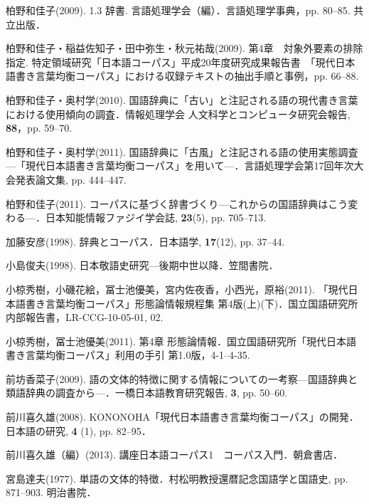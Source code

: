 \documentclass[japanese]{jnlp_1.4}
\begin{document}
\begin{thebibliography}{}
\item
柏野和佳子(2009). 1.3 辞書. 言語処理学会（編）．言語処理学事典，pp. 80--85. 共立出版．

\item
柏野和佳子・稲益佐知子・田中弥生・秋元祐哉(2009). 第4章　対象外要素の排除指定. 
特定領域研究「日本語コーパス」平成20年度研究成果報告書　「現代日本語書き言葉均衡コーパス」における収録テキストの抽出手順と事例，pp. 66--88.

\item
柏野和佳子・奥村学(2010). 
国語辞典に「古い」と注記される語の現代書き言葉における使用傾向の調査．情報処理学会 
人文科学とコンピュータ研究会報告, \textbf{88}，pp. 59--70.

\item
柏野和佳子・奥村学(2011). 
国語辞典に「古風」と注記される語の使用実態調査—「現代日本語書き言葉均衡コーパス」を用いて—．言語処理学会第17回年次大会発表論文集, 
pp. 444--447.

\item
柏野和佳子(2011). 
コーパスに基づく辞書づくり—これからの国語辞典はこう変わる—．日本知能情報ファジイ学会誌, 
\textbf{23}(5), pp. 705--713.

\item
加藤安彦(1998). 辞典とコーパス．日本語学, \textbf{17}(12), pp. 37--44.

\item
小島俊夫(1998). 日本敬語史研究—後期中世以降．笠間書院．

\item
小椋秀樹，小磯花絵，冨士池優美，宮内佐夜香，小西光，原裕(2011). 
「現代日本語書き言葉均衡コーパス」形態論情報規程集 
第4版(上)(下)．国立国語研究所内部報告書，LR-CCG-10-05-01, 02.

\item
小椋秀樹，冨士池優美(2011). 第4章 
形態論情報．国立国語研究所「現代日本語書き言葉均衡コーパス」利用の手引 
第1.0版，4-1--4-35.

\item
前坊香菜子(2009). 
語の文体的特徴に関する情報についての一考察—国語辞典と類語辞典の調査から—．一橋日本語教育研究報告, 
\textbf{3}, pp. 50--60.

\item
前川喜久雄(2008). 
KONONOHA「現代日本語書き言葉均衡コーパス」の開発．日本語の研究, \textbf{4} 
(1), pp. 82--95．

\item
前川喜久雄（編）(2013). 講座日本語コーパス1　コーパス入門．朝倉書店．

\item
宮島達夫(1977). 単語の文体的特徴．村松明教授還暦記念国語学と国語史, pp. 871--903. 明治書院．


\end{thebibliography}
\end{document}
